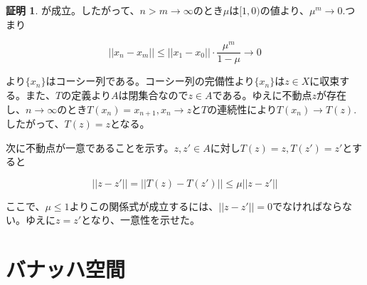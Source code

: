 \documentclass[dvipdfmx,autodetect-engine]{jsarticle}
\theoremstyle{definition}
\newtheorem*{Proof*}{証明}
\begin{document}
{\begin{Proof*}
が成立。したがって、$n > m \to \infty$のとき$\mu$は$[1, 0)$の値より、$\mu^m \to 0$.つまり

$$
||x_n - x_m|| \leq ||x_1 - x_0|| \cdot \frac{\mu^m}{1 - \mu} \to 0
$$

より$\{x_n\}$はコーシー列である。コーシー列の完備性より$\{x_n\}$は$z \in X$に収束する。また、$T$の定義より$A$は閉集合なので$z \in A$である。ゆえに不動点$z$が存在し、$n \to \infty$のとき$T(x_n) = x_{n+1}, x_n \to z$と$T$の連続性により$T(x_n) \to T(z)$. したがって、$T(z) = z$となる。


次に不動点が一意であることを示す。$z, z' \in A$に対し$T(z) = z, T(z') = z'$とすると

$$
||z - z'|| = ||T(z) - T(z')|| \leq \mu ||z - z'||
$$

ここで、$\mu \leq 1$よりこの関係式が成立するには、$||z - z'|| = 0$でなければならない。ゆえに$z = z'$となり、一意性を示せた。

\end{Proof*}
}

\section{バナッハ空間}
\end{document}
